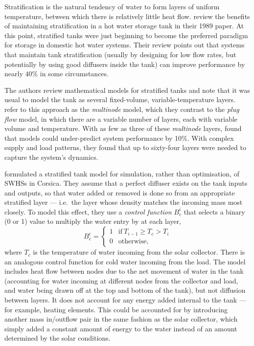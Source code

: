 Stratification is the natural tendency of water to form layers of uniform temperature, between which there is relatively little heat flow.
\textcite{Hollands89} review the benefits of maintaining stratification in a hot water storage tank in their 1989 paper.
At this point, stratified tanks were just beginning to become the preferred paradigm for storage in domestic hot water systems.
Their review points out that systems that maintain tank stratification (usually by designing for low flow rates, but potentially by using good diffusers inside the tank) can improve performance by nearly 40\% in some circumstances.

The authors review mathematical models for stratified tanks and note that it was usual to model the tank as several fixed-volume, variable-temperature layers.
\textcite{Kleinbach93} refer to this approach as the \emph{multinode} model, which they contrast to the \emph{plug flow} model, in which there are a variable number of layers, each with variable volume and temperature.
With as few as three of these \emph{multinode} layers,  found that models could under-predict system performance by 10\%.
With complex supply and load patterns, they found that up to sixty-four layers were needed to capture the system's dynamics.

\textcite{Cristofari02} formulated a stratified tank model for simulation, rather than optimisation, of SWHSs in Corsica.
They assume that a perfect diffuser exists on the tank inputs and outputs, so that water added or removed is done so from an appropriate stratified layer --- i.e.\ the layer whose density matches the incoming mass most closely.
To model this effect, they use a \emph{control function} $B_c^i$ that selects a binary (0 or 1) value to multiply the water entry by at each layer,
$$ B_c^i = \left\{ \begin{array}{ll}
   1 & \text{if}\ T_{i-1} \geq T_c > T_i \\
   0 & \text{otherwise},
\end{array} \right. $$
where $T_c$ is the temperature of water incoming from the solar collector.
There is an analogous control function for cold water incoming from the load.
The model includes heat flow between nodes due to the net movement of water in the tank (accounting for water incoming at different nodes from the collector and load, and water being drawn off at the top and bottom of the tank), but not diffusion between layers.
It does not account for any energy added internal to the tank --- for example, heating elements.
This could be accounted for by introducing another mass in/outflow pair in the same fashion as the solar collector, which simply added a constant amount of energy to the water instead of an amount determined by the solar conditions.

